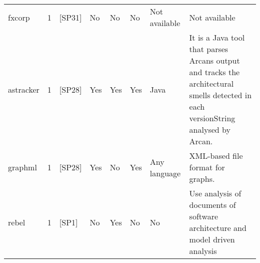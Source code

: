 \begin{tabular}{lrllllll}
              fxcorp &      1 &                                                 [SP31] &    No &       No &        No &                                                                                                                                                                           Not available &                                                                                                                                                                                                                                                                                                                                                                                                    Not available \\
           astracker &      1 &                                                 [SP28] &   Yes &      Yes &       Yes &                                                                                                                                                                                    Java &                                                                                                                                                                                                                                                                                It is a Java tool that parses Arcans output and tracks the architectural smells detected in each versionString analysed by Arcan. \\
             graphml &      1 &                                                 [SP28] &   Yes &       No &       Yes &                                                                                                                                                                            Any language &                                                                                                                                                                                                                                                                                                                                                                                XML-based file format for graphs. \\
               rebel &      1 &                                                  [SP1] &    No &      Yes &        No &                                                                                                                                                                                      No &                                                                                                                                                                                                                                                                                                                                     Use analysis of documents of software architecture and model driven analysis \\

\end{tabular}
